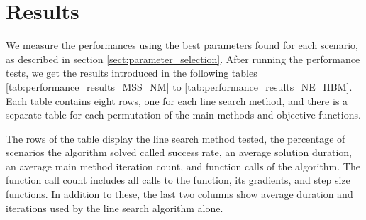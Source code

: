 \documentclass[english, 12pt, a4paper, sci, utf8, a-1b, online, table]{aaltothesis}
\begin{document}


\section{Results}
\label{sect:results}

We measure the performances using the best parameters found for each scenario, as described in section \ref{sect:parameter_selection}. After running the performance tests, we get the results introduced in the following tables \ref{tab:performance_results_MSS_NM} to \ref{tab:performance_results_NE_HBM}. Each table contains eight rows, one for each line search method, and there is a separate table for each permutation of the main methods and objective functions. 

The rows of the table display the line search method tested, the percentage of scenarios the algorithm solved called success rate, an average solution duration, an average main method iteration count, and function calls of the algorithm. The function call count includes all calls to the function, its gradients, and step size functions. In addition to these, the last two columns show average duration and iterations used by the line search algorithm alone.
\end{document}
